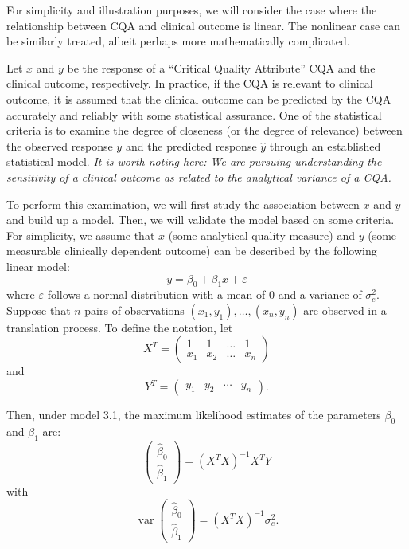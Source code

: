 \documentclass[
  12pt,
  a4paper,
]{article}
\numberwithin{equation}{section}
\theoremstyle{plain}
\theoremstyle{definition}
\theoremstyle{remark}
\theoremstyle{note}
\begin{document}
For simplicity and illustration purposes, we will consider the case
where the relationship between CQA and clinical outcome is linear. The
nonlinear case can be similarly treated, albeit perhaps more
mathematically complicated.

Let \(x\) and \(y\) be the response of a ``Critical Quality Attribute''
CQA and the clinical outcome, respectively. In practice, if the CQA is
relevant to clinical outcome, it is assumed that the clinical outcome
can be predicted by the CQA accurately and reliably with some
statistical assurance. One of the statistical criteria is to examine the
degree of closeness (or the degree of relevance) between the observed
response \(y\) and the predicted response \(\hat{y}\) through an
established statistical model. \emph{It is worth noting here: We are
pursuing understanding the sensitivity of a clinical outcome as related
to the analytical variance of a CQA.}

To perform this examination, we will first study the association between
\(x\) and \(y\) and build up a model. Then, we will validate the model
based on some criteria. For simplicity, we assume that \(x\) (some
analytical quality measure) and \(y\) (some measurable clinically
dependent outcome) can be described by the following linear model: \[
y=\beta_0+\beta_1 x+\varepsilon
\] where \(\varepsilon\) follows a normal distribution with a mean of 0
and a variance of \(\sigma_e^2\). Suppose that \(n\) pairs of
observations \(\left(x_1, y_1\right), \ldots,\left(x_n, y_n\right)\) are
observed in a translation process. To define the notation, let \[
X^T=\left(\begin{array}{llll}
1 & 1 & \ldots & 1 \\
x_1 & x_2 & \ldots & x_n
\end{array}\right)
\] and \[
Y^T=\left(\begin{array}{llll}
y_1 & y_2 & \cdots & y_n
\end{array}\right) .
\]

Then, under model 3.1, the maximum likelihood estimates of the
parameters \(\beta_0\) and \(\beta_1\) are: \[
\left(\begin{array}{l}
\hat{\beta}_0 \\
\hat{\beta}_1
\end{array}\right)=\left(X^T X\right)^{-1} X^T Y
\] with \[
\operatorname{var}\left(\begin{array}{l}
\hat{\beta}_0 \\
\hat{\beta}_1
\end{array}\right)=\left(X^T X\right)^{-1} \sigma_e^2 .
\]
\end{document}
